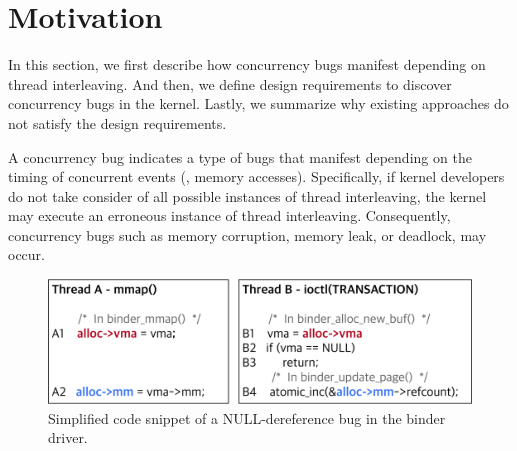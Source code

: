 \section{Motivation}
\label{s:motivation}


In this section, we first describe how concurrency bugs manifest
depending on thread interleaving.
%
And then, we define design requirements to discover concurrency bugs
in the kernel.
%
Lastly, we summarize why existing approaches do not satisfy the design
requirements.



%
A concurrency bug indicates a type of bugs that manifest depending on
the timing of concurrent events (\eg, memory accesses).
%
Specifically, if kernel developers do not take consider of all
possible instances of thread interleaving, the kernel may execute an
erroneous instance of thread interleaving.
%
Consequently, concurrency bugs such as memory corruption, memory leak,
or deadlock, may occur.


\begin{figure}[t]
  \centering
  \includegraphics[width=0.95\linewidth]{fig/cve-2017-10661.pdf}
  \caption{Simplified code snippet of a NULL-dereference bug in the
    binder driver.}
  \label{fig:cve-2019-6974}
\end{figure}

